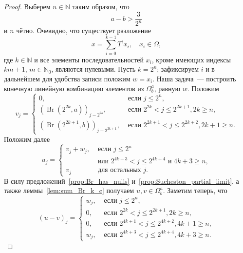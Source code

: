 \documentclass{article}
\theoremstyle{plain}
\theoremstyle{definition}
\newtheorem{proof}{Доказательство}\def\theproof{}
\begin{document}
\begin{fulltext}
\begin{proof}
	Выберем $n\in\mathbb{N}$ таким образом, что
	\begin{equation}
		\label{eq:Omega_a_b_gap}
		a - b > \frac{3}{2^n}
	\end{equation}
	и $n$ чётно.
	Очевидно, что существует разложение
	\begin{equation}
		x = \sum_{i=0}^{k-1} T^i x_i, \quad x_i \in \Omega
		,
	\end{equation}
	где $k\in\mathbb{N}$ и все элементы последовательностей $x_i$,
	кроме имеющих индексы $km+1$, $m\in\mathbb{N}_0$, являются нулевыми.
	Пусть $k=2^n$; зафиксируем $i$ и в дальнейшем для удобства записи положим $w=x_i$.
	Наша задача~--- построить конечную линейную комбинацию элементов из $\Omega^a_b$, равную $w$.
	Положим
	\begin{equation}
		v_j = \begin{cases}
			0,  & \mbox{~если~} j \leq 2^n,
			\\
			(\operatorname{Br}(2^{2k  },a))_{j-2^{2k  }},  & \mbox{~если~} 2^{2k  } < j \leq 2^{2k+1}, 2k   \geq n,
			\\
			(\operatorname{Br}(2^{2k+1},b))_{j-2^{2k+1}},  & \mbox{~если~} 2^{2k+1} < j \leq 2^{2k+2}, 2k+1 \geq n
			.
		\end{cases}
	\end{equation}
	Положим далее
	\begin{equation}
		u_j = \begin{cases}
			v_j + w_j,  & \mbox{~если~} j \leq 2^n
			\\
			            & \mbox{~или~} 2^{4k+3} < j \leq 2^{4k+4} \mbox{~и~} 4k + 3 \geq n,
			\\
			v_j         & \mbox{~для остальных~} j
			.
		\end{cases}
	\end{equation}
	В силу предложений~\ref{prop:Br_has_nulls} и~\ref{prop:Sucheston_partial_limit}, а также леммы~\ref{lem:sum_Br_k_c}
	получаем $u,v\in\Omega^a_b$.
	Заметим теперь, что
	\begin{equation}
		(u-v)_j = \begin{cases}
			w_j,  & \mbox{~если~} j \leq 2^n,
			\\
			0,  & \mbox{~если~} 2^{2k  } < j \leq 2^{2k+1}, 2k    \geq n,
			\\
			0,  & \mbox{~если~} 2^{4k+1} < j \leq 2^{4k+2}, 4k + 1 \geq n,
			\\
			w_j,  & \mbox{~если~} 2^{4k+3} < j \leq 2^{4k+4}, 4k + 3 \geq n
			.
		\end{cases}
	\end{equation}


\end{proof}
\end{fulltext}
\end{document}
